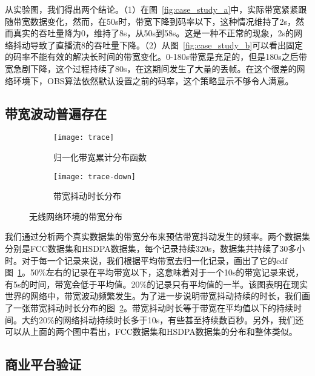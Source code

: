 从实验图，我们得出两个结论。（1）在图~\ref{fig:case_study_a}中，实际带宽紧紧跟随带宽数据变化，然而，在50s时，带宽下降到码率以下，这种情况维持了2s，然而真实的吞吐量降为0，维持了8s，从50s到58s。这是一种不正常的现象，2s的网络抖动导致了直播流8的吞吐量下降。（2）从图~\ref{fig:case_study_b}可以看出固定的码率不能有效的解决长时间的带宽变化。0-180s带宽是充足的，但是180s之后带宽急剧下降，这个过程持续了80s，在这期间发生了大量的丢帧。在这个很差的网络环境下，OBS算法依然默认设置之前的码率，这个策略显示不够令人满意。

\subsection{带宽波动普遍存在}
\begin{figure}[h]
  \centering%
  \begin{subfigure}{0.7\textwidth}
    \texttt{[image: trace]}
    \caption{归一化带宽累计分布函数}
    \label{fig:trace}
  \end{subfigure}%
  \vfill
  \vspace{0.2in}
  \begin{subfigure}{0.7\textwidth}
    \texttt{[image: trace-down]}
    \caption{带宽抖动时长分布}
    \label{fig:trace_down}
  \end{subfigure}
  \caption{无线网络环境的带宽分布}
  \label{fig:case_study}
\end{figure}

我们通过分析两个真实数据集的带宽分布来预估带宽抖动发生的频率。两个数据集分别是FCC数据集和HSDPA数据集，每个记录持续320s，数据集共持续了30多小时。对于每一个记录来说，我们根据平均带宽去归一化记录，画出了它的cdf图~\ref{fig:trace}。50\%左右的记录在平均带宽以下，这意味着对于一个10s的带宽记录来说，有5s的时间，带宽会低于平均值。20\%的记录只有平均值的一半。该图表明在现实世界的网络中，带宽波动频繁发生。为了进一步说明带宽抖动持续的时长，我们画了一张带宽抖动时长分布的图~\ref{fig:trace_down}。带宽抖动时长等于带宽在平均值以下的持续时间。大约20\%的网络抖动持续时长多于10s，有些甚至持续数百秒。另外，我们还可以从上面的两个图中看出，FCC数据集和HSDPA数据集的分布和整体类似。

\subsection{商业平台验证}

